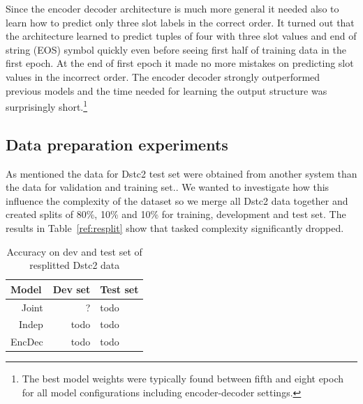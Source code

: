 \documentclass{itatnew}
\begin{document}
Since the encoder decoder architecture is much more general it needed also to learn how to predict only three slot labels in the correct order.
It turned out that the architecture learned to predict tuples of four with three slot values and end of string (EOS) symbol quickly even before seeing first half of training data in the first epoch.
At the end of first epoch it made no more mistakes on predicting slot values in the incorrect order.
The encoder decoder strongly outperformed previous models and the time needed for learning the output structure was surprisingly short.\footnote{The best model weights were typically found between fifth and eight epoch for all model configurations including encoder-decoder settings.}

\subsection{Data preparation experiments}
\label{sec:split}
As mentioned the data for Dstc2 test set were obtained from another system than the data for validation and training set.\cite{verify and cite dstc2}.
We wanted to investigate how this influence the complexity of the dataset so we merge all Dstc2 data together and created splits of 80\%, 10\% and 10\% for training, development and test set.
The results in Table~\ref{ref:resplit} show that tasked complexity significantly dropped.

\begin{table}
\caption{Accuracy on dev and test set of resplitted Dstc2 data}
\begin{center}
\begin{tabular}{r@{\quad}rll}
\hline
\multicolumn{1}{l}{\rule{0pt}{12pt}
                   Model}&\multicolumn{1}{l}{Dev set}&\multicolumn{2}{l}{Test set}\\[2pt]
\hline\rule{0pt}{12pt}
Joint  &     ?&  todo \\
Indep  &   todo& todo \\
EncDec &   todo& todo \\
\hline
\end{tabular}
\end{center}
\label{tab:repslit}
\end{table}
\end{document}

